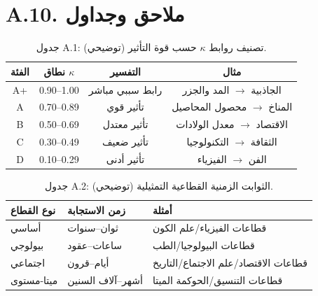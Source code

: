 \documentclass[13pt,a4paper]{article}
\begin{document}
	\section*{A.10. ملاحق وجداول}
	
	\begin{table}[htbp]
		\centering
		\small
		\begin{tabular}{cccc}
			\toprule
			\textbf{الفئة} & \textbf{نطاق $\kappa$} & \textbf{التفسير} & \textbf{مثال} \\
			\midrule
			A+ & 0.90--1.00 & رابط سببي مباشر & الجاذبية $\rightarrow$ المد والجزر \\
			A  & 0.70--0.89 & تأثير قوي & المناخ $\rightarrow$ محصول المحاصيل \\
			B  & 0.50--0.69 & تأثير معتدل & الاقتصاد $\rightarrow$ معدل الولادات \\
			C  & 0.30--0.49 & تأثير ضعيف & الثقافة $\rightarrow$ التكنولوجيا \\
			D  & 0.10--0.29 & تأثير أدنى & الفن $\rightarrow$ الفيزياء \\
			\bottomrule
		\end{tabular}
		\caption{جدول A.1: تصنيف روابط $\kappa$ حسب قوة التأثير (توضيحي).}
	\end{table}
	
	\begin{table}[htbp]
		\centering
		\small
		\begin{tabular}{p{}p{}p{}}
			\toprule
			\textbf{نوع القطاع} & \textbf{زمن الاستجابة} & \textbf{أمثلة} \\
			\midrule
			أساسي & ثوان--سنوات & قطاعات الفيزياء/علم الكون \\
			بيولوجي  & ساعات--عقود & قطاعات البيولوجيا/الطب \\
			اجتماعي      & أيام--قرون & قطاعات الاقتصاد/علم الاجتماع/التاريخ \\
			ميتا-مستوى  & أشهر--آلاف السنين & قطاعات التنسيق/الحوكمة الميتا \\
			\bottomrule
		\end{tabular}
		\caption{جدول A.2: الثوابت الزمنية القطاعية التمثيلية (توضيحي).}
	\end{table}
	
\end{document}
